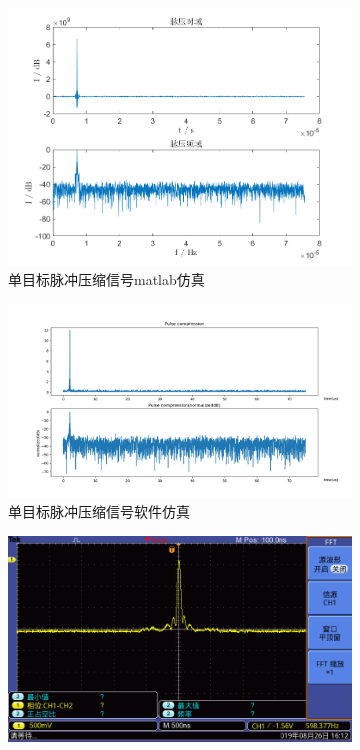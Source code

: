 \documentclass{article}
\newcounter{sub}
\begin{document}
\begin{figure}[H]
	\centering
	\begin{subfigure}[H]{.45\linewidth}
		\centering
		\includegraphics[width=\linewidth]{one-pulse-matlab.png}
		\caption{单目标脉冲压缩信号matlab仿真}
		\label{fig:单目标脉冲压缩信号matlab仿真}
	\end{subfigure}
	\quad
	\begin{subfigure}[H]{.45\linewidth}
		\centering
		\includegraphics[width=\linewidth]{one-pulse-software.png}
		\caption{单目标脉冲压缩信号软件仿真}
		\label{fig:单目标脉冲压缩信号软件仿真}
	\end{subfigure}
	\quad
	\begin{subfigure}[H]{.45\linewidth}
		\centering
		\includegraphics[width=\linewidth]{one-pulse-hardware.png}

\end{subfigure}
\end{figure}
\end{document}
